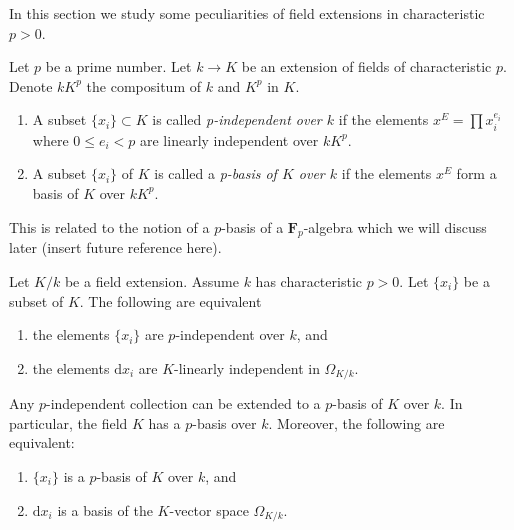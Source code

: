 \noindent
In this section we study some peculiarities of field extensions in
characteristic $p > 0$.

\begin{definition}
\label{definition-p-basis}
Let $p$ be a prime number. Let $k \to K$ be an extension of fields
of characteristic $p$. Denote $kK^p$ the compositum of $k$ and $K^p$
in $K$.
\begin{enumerate}
\item A subset $\{x_i\} \subset K$ is called {\it p-independent
over $k$} if the elements $x^E = \prod x_i^{e_i}$ where
$0 \leq e_i < p$ are linearly independent over $kK^p$.
\item A subset $\{x_i\}$ of $K$ is called a
{\it p-basis of $K$ over $k$} if the elements
$x^E$ form a basis of $K$ over $kK^p$.
\end{enumerate}
\end{definition}

\noindent
This is related to the notion of a $p$-basis of a $\mathbf{F}_p$-algebra
which we will discuss later (insert future reference here).

\begin{lemma}
\label{lemma-p-basis}
Let $K/k$ be a field extension. Assume $k$ has characteristic
$p > 0$. Let $\{x_i\}$ be a subset of $K$. The following are equivalent
\begin{enumerate}
\item the elements $\{x_i\}$ are $p$-independent over $k$, and
\item the elements $\text{d}x_i$ are $K$-linearly independent
in $\Omega_{K/k}$.
\end{enumerate}
Any $p$-independent collection can be extended to a $p$-basis of $K$ over $k$.
In particular, the field $K$ has a $p$-basis over $k$.
Moreover, the following are equivalent:
\begin{enumerate}
\item[(a)] $\{x_i\}$ is a $p$-basis of $K$ over $k$, and
\item[(b)] $\text{d}x_i$ is a basis of the $K$-vector space $\Omega_{K/k}$.
\end{enumerate}
\end{lemma}

